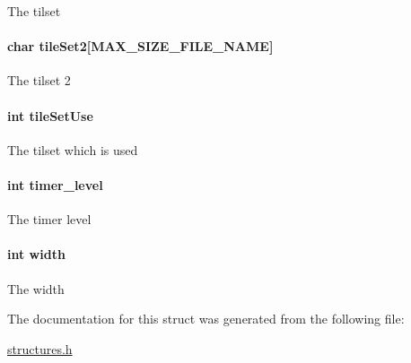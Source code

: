 The tilset \hypertarget{struct_level_a31c790abec040f1888acf0e062d1c827}{
\paragraph[{tile\-Set2}]{\setlength{\rightskip}{0pt plus 5cm}char tile\-Set2\mbox{[}{\bf M\-A\-X\-\_\-\-S\-I\-Z\-E\-\_\-\-F\-I\-L\-E\-\_\-\-N\-A\-M\-E}\mbox{]}}}\label{struct_level_a31c790abec040f1888acf0e062d1c827}
The tilset 2 \hypertarget{struct_level_ad086ee40635033453f3e41bc143af7b7}{
\paragraph[{tile\-Set\-Use}]{\setlength{\rightskip}{0pt plus 5cm}int tile\-Set\-Use}}\label{struct_level_ad086ee40635033453f3e41bc143af7b7}
The tilset which is used \hypertarget{struct_level_a28c59da9677a9d7b98db49328a77dc3c}{
\paragraph[{timer\-\_\-level}]{\setlength{\rightskip}{0pt plus 5cm}int timer\-\_\-level}}\label{struct_level_a28c59da9677a9d7b98db49328a77dc3c}
The timer level \hypertarget{struct_level_a2474a5474cbff19523a51eb1de01cda4}{
\paragraph[{width}]{\setlength{\rightskip}{0pt plus 5cm}int width}}\label{struct_level_a2474a5474cbff19523a51eb1de01cda4}
The width 

The documentation for this struct was generated from the following file\-:\begin{DoxyCompactItemize}
\item 
\hyperlink{structures_8h}{structures.\-h}\end{DoxyCompactItemize}
